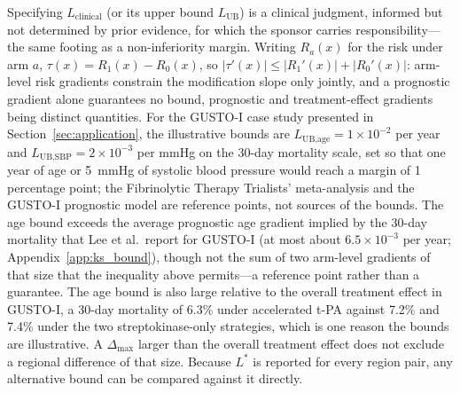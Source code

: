 \documentclass[AMA,Times1COL]{WileyNJDv5}
\begin{document}
Specifying $L_{\text{clinical}}$ (or its upper bound $L_{\text{UB}}$) is a clinical judgment, informed but not determined by prior evidence, for which the sponsor carries responsibility---the same footing as a non-inferiority margin. Writing $R_a(x)$ for the risk under arm $a$, $\tau(x) = R_1(x) - R_0(x)$, so $|\tau'(x)| \leq |R_1'(x)| + |R_0'(x)|$: arm-level risk gradients constrain the modification slope only jointly, and a prognostic gradient alone guarantees no bound, prognostic and treatment-effect gradients being distinct quantities.\cite{ballman2015,kent2020} For the GUSTO-I case study presented in Section~\ref{sec:application}, the illustrative bounds are $L_{\text{UB,age}} = 1 \times 10^{-2}$ per year and $L_{\text{UB,SBP}} = 2 \times 10^{-3}$ per mmHg on the 30-day mortality scale, set so that one year of age or 5~mmHg of systolic blood pressure would reach a margin of 1 percentage point; the Fibrinolytic Therapy Trialists' meta-analysis\cite{ftt1994} and the GUSTO-I prognostic model\cite{lee1995} are reference points, not sources of the bounds. The age bound exceeds the average prognostic age gradient implied by the 30-day mortality that Lee et al.\ report for GUSTO-I (at most about $6.5 \times 10^{-3}$ per year; Appendix~\ref{app:ks_bound}),\cite{lee1995} though not the sum of two arm-level gradients of that size that the inequality above permits---a reference point rather than a guarantee. The age bound is also large relative to the overall treatment effect in GUSTO-I, a 30-day mortality of 6.3\% under accelerated t-PA against 7.2\% and 7.4\% under the two streptokinase-only strategies,\cite{gusto1993} which is one reason the bounds are illustrative. A $\Delta_{\max}$ larger than the overall treatment effect does not exclude a regional difference of that size. Because $L^*$ is reported for every region pair, any alternative bound can be compared against it directly.
\end{document}

